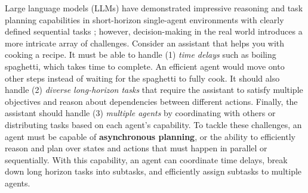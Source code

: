 
Large language models (LLMs) have demonstrated impressive reasoning and task planning capabilities in short-horizon single-agent environments with clearly defined sequential tasks \citep{yao2022react,yao2023treethoughtsdeliberateproblem,shinn2023reflexionlanguageagentsverbal}; however, decision-making in the real world introduces a more intricate array of challenges. Consider an assistant that helps you with cooking a recipe. It must be able to handle (1) \emph{time delays} such as boiling spaghetti, which takes time to complete. An efficient agent would move onto other steps instead of waiting for the spaghetti to fully cook. It should also handle (2) \emph{diverse long-horizon tasks} that require the assistant to satisfy multiple objectives and reason about dependencies between different actions. Finally, the assistant should handle (3) \emph{multiple agents} by coordinating with others or distributing tasks based on each agent's capability. To tackle these challenges, an agent must be capable of \textbf{asynchronous planning}, or the ability to efficiently reason and plan over states and actions that must happen in parallel or sequentially. With this capability, an agent can coordinate time delays, break down long horizon tasks into subtasks, and efficiently assign subtasks to multiple agents. 






